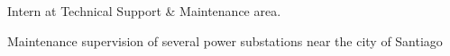 Intern at Technical Support \& Maintenance area.
\begin{tightemize}
\item Maintenance supervision of several power substations near the city of Santiago
\end{tightemize}
\sectionsep